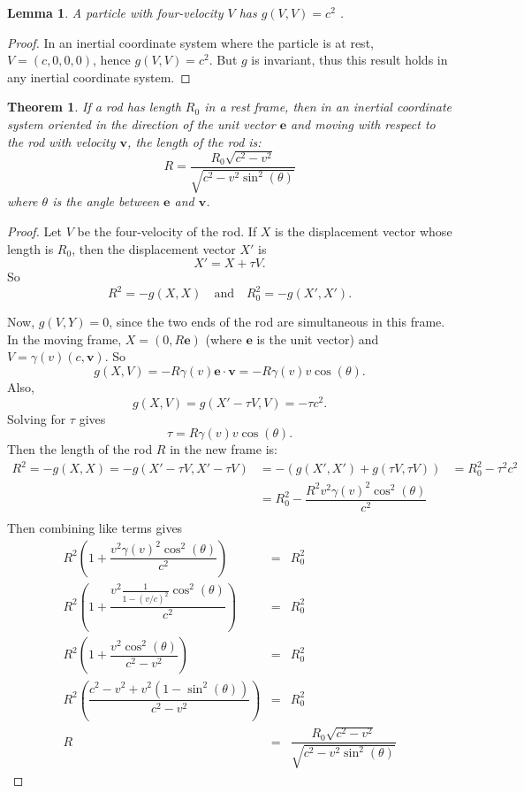 \documentclass[12pt]{article}
\newtheorem{thm}{Theorem}
\newtheorem{lem}{Lemma}
\theoremstyle{defn}
\theoremstyle{pf}
\newcommand{\0}{\emptyset}
\renewcommand{\-}{\setminus}
\begin{document}
\begin{lem}
 A particle with four-velocity $V$ has $g(V,V)=c^2$ \cite{woodhouse}.
\end{lem}
\begin{proof}
 In an inertial coordinate system where the particle is at rest, $V=(c,0,0,0)$, hence $g(V,V)=c^2$. But $g$ is invariant, thus this result holds in any inertial coordinate system.
\end{proof}

\begin{thm}If a rod has length $R_0$ in a rest frame, then in an inertial coordinate system oriented in the direction of the unit vector $\textbf{e}$ and moving with respect to the rod with velocity $\textbf{v}$, the length of the rod is:
 $$R=\dfrac{R_0\sqrt{c^2-v^2}}{\sqrt{c^2-v^2\sin^2(\theta)}}$$
where $\theta$ is the angle between $\textbf{e}$ and $\textbf{v}$.
\end{thm}
\begin{proof}
 Let $V$ be the four-velocity of the rod. If $X$ is the displacement vector whose length is $R_0$, then the displacement vector $X'$ is $$X'=X+\tau V.$$ So $$R^2=-g(X,X) \quad \mbox{and} \quad R_0^2=-g(X',X').$$

Now, $g(V,Y)=0$, since the two ends of the rod are simultaneous in this frame. In the moving frame, $X=(0,R\textbf{e})$ (where $\textbf{e}$ is the unit vector) and $V=\gamma(v)(c,\textbf{v})$. So $$g(X,V)=-R\gamma(v)\textbf{e}\cdot\textbf{v}=-R\gamma(v)v\cos(\theta).$$ Also, $$g(X,V)=g(X'-\tau V,V)=-\tau c^2.$$ Solving for $\tau$ gives $$\tau=R\gamma(v)v\cos(\theta).$$ Then the length of the rod $R$ in the new frame is:
\begin{eqnarray*}R^2=-g(X,X)=-g(X'-\tau V,X'-\tau V)&=-\left(g(X',X')+g(\tau V,\tau V)\right)&=R_0^2-\tau^2c^2\\
&=R_0^2-\dfrac{R^2v^2\gamma(v)^2\cos^2(\theta)}{c^2}\\
\end{eqnarray*}
Then combining like terms gives
\begin{eqnarray*}
 R^2\left(1+\dfrac{v^2\gamma(v)^2\cos^2(\theta)}{c^2}\right)&=&R_0^2\\
R^2\left(1+\dfrac{v^2\frac{1}{1-(v/c)^2}\cos^2(\theta)}{c^2}\right)&=&R_0^2\\
R^2\left(1+\dfrac{v^2\cos^2(\theta)}{c^2-v^2}\right)&=&R_0^2\\
R^2\left(\dfrac{c^2-v^2+v^2(1-\sin^2(\theta))}{c^2-v^2}\right)&=&R_0^2\\
R&=&\dfrac{R_0\sqrt{c^2-v^2}}{\sqrt{c^2-v^2\sin^2(\theta)}}
\end{eqnarray*}
\end{proof}
\end{document}
